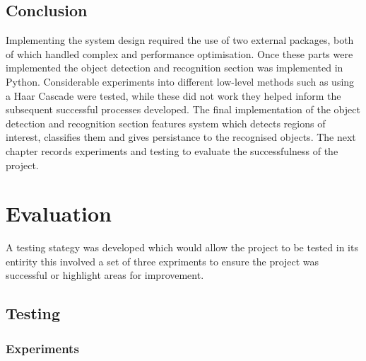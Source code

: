 \documentclass{mproj}
\begin{document}
\section{Conclusion}

Implementing the system design required the use of two external packages, both of which handled complex and performance optimisation. Once these parts were implemented the object detection and recognition section was implemented in Python. Considerable experiments into different low-level methods such as using a Haar Cascade were tested, while these did not work they helped inform the subsequent successful processes developed. The final implementation of the  object detection and recognition section features system which detects regions of interest, classifies them and gives persistance to the recognised objects. The next chapter records experiments and testing to evaluate the successfulness of the project.


\chapter{Evaluation}

A testing stategy was developed which would allow the project to be tested in its entirity this involved a set of three expriments to ensure the project was successful or highlight areas for improvement.

\section{Testing}
\subsection{Experiments}
\end{document}
